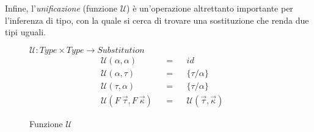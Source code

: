 \noindent Infine, l'\textit{unificazione} (funzione $\mathcal{U}$) è un'operazione altrettanto importante per l'inferenza di tipo,
con la quale si cerca di trovare una sostituzione che renda due tipi uguali.

\begin{figure}
    \vspace{4mm}
    $\mathcal{U} : Type \times Type \rightarrow Substitution$
    \newcommand{\funU}[2]{\mathcal{U}(#1, #2)}
    \newcommand{\funUline}[3]{& \funU{#1}{#2} & & = & & {#3}}
    \[
        \begin{aligned}
            \funUline{\alpha}{\alpha}{id}              \\
            \funUline{\alpha}{\tau}{\{\tau / \alpha\}} \\
            \funUline{\tau}{\alpha}{\{\tau / \alpha\}} \\
            \funUline{F\ \vec{\tau}}{F\ \vec{\kappa}}{\funU{\vec{\tau}}{\vec{\kappa}}}
        \end{aligned}
    \]
    \caption{Funzione $\mathcal{U}$}
    \label{fig:3-4-unification}
\end{figure}